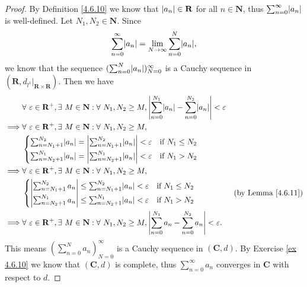 \begin{proof}
    By Definition \ref{4.6.10} we know that \(\abs*{a_n} \in \mathbf{R}\) for all \(n \in \mathbf{N}\), thus \(\sum_{n = 0}^\infty \abs*{a_n}\) is well-defined.
    Let \(N_1, N_2 \in \mathbf{N}\).
    Since
    \[
        \sum_{n = 0}^\infty \abs*{a_n} = \lim_{N \to \infty} \sum_{n = 0}^N \abs*{a_n},
    \]
    we know that the sequence \((\sum_{n = 0}^N \abs*{a_n})_{N = 0}^\infty\) is a Cauchy sequence in \((\mathbf{R}, d_{l^1}|_{\mathbf{R} \times \mathbf{R}})\).
    Then we have
    \begin{align*}
                 & \forall\ \varepsilon \in \mathbf{R}^+, \exists\ M \in \mathbf{N} : \forall\ N_1, N_2 \geq M, \abs*{\sum_{n = 0}^{N_1} \abs*{a_n} - \sum_{n = 0}^{N_2} \abs*{a_n}} < \varepsilon                                  \\
        \implies & \forall\ \varepsilon \in \mathbf{R}^+, \exists\ M \in \mathbf{N} : \forall\ N_1, N_2 \geq M,                                                                                                                     \\
                 & \begin{cases}
            \sum_{n = N_1 + 1}^{N_2} \abs*{a_n} = \abs*{\sum_{n = N_1 + 1}^{N_2} \abs*{a_n}} < \varepsilon & \text{if } N_1 \leq N_2 \\
            \sum_{n = N_2 + 1}^{N_1} \abs*{a_n} = \abs*{\sum_{n = N_2 + 1}^{N_1} \abs*{a_n}} < \varepsilon & \text{if } N_1 > N_2
        \end{cases}                                                                                                                                                                                       \\
        \implies & \forall\ \varepsilon \in \mathbf{R}^+, \exists\ M \in \mathbf{N} : \forall\ N_1, N_2 \geq M,                                                                                                                     \\
                 & \begin{cases}
            \abs*{\sum_{n = N_1 + 1}^{N_2} a_n} \leq \sum_{n = N_1 + 1}^{N_2} \abs*{a_n} < \varepsilon & \text{if } N_1 \leq N_2 \\
            \abs*{\sum_{n = N_2 + 1}^{N_1} a_n} \leq \sum_{n = N_2 + 1}^{N_1} \abs*{a_n} < \varepsilon & \text{if } N_1 > N_2
        \end{cases}                                                                                                                                                      & \text{(by Lemma \ref{4.6.11})} \\
        \implies & \forall\ \varepsilon \in \mathbf{R}^+, \exists\ M \in \mathbf{N} : \forall\ N_1, N_2 \geq M, \abs*{\sum_{n = 0}^{N_1} a_n - \sum_{n = 0}^{N_2} a_n} < \varepsilon.
    \end{align*}
    This means \((\sum_{n = 0}^N a_n)_{N = 0}^\infty\) is a Cauchy sequence in \((\mathbf{C}, d)\).
    By Exercise \ref{ex 4.6.10} we know that \((\mathbf{C}, d)\) is complete, thus \(\sum_{n = 0}^\infty a_n\) converges in \(\mathbf{C}\) with respect to \(d\).
\end{proof}

